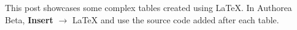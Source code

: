 This post showcases some complex tables created using LaTeX. In Authorea Beta, \textbf{Insert} $\rightarrow$ LaTeX and use the source code added after each table.

\newline